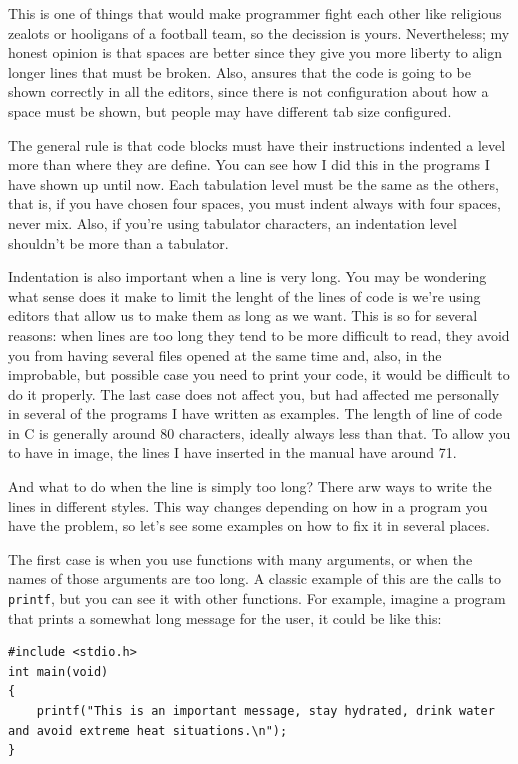 \documentclass[a4paper]{article}
\begin{document}
This is one of things that would make programmer fight each other like religious
zealots or hooligans of a football team, so the decission is yours.
Nevertheless; my honest opinion is that spaces are better since they give you
more liberty to align longer lines that must be broken. Also, ansures that the
code is going to be shown correctly in all the editors, since there is not
configuration about how a space must be shown, but people may have different tab
size configured.

The general rule is that code blocks must have their instructions indented a
level more than where they are define. You can see how I did this in the
programs I have shown up until now. Each tabulation level must be the same as
the others, that is, if you have chosen four spaces, you must indent always with
four spaces, never mix. Also, if you're using tabulator characters, an
indentation level shouldn't be more than a tabulator.

Indentation is also important when a line is very long. You may be wondering
what sense does it make to limit the lenght of the lines of code is we're using
editors that allow us to make them as long as we want. This is so for several
reasons: when lines are too long they tend to be more difficult to read, they
avoid you from having several files opened at the same time and, also, in the
improbable, but possible case you need to print your code, it would be difficult
to do it properly. The last case does not affect you, but had affected me
personally in several of the programs I have written as examples. The length of
line of code in C is generally around 80 characters, ideally always less than
that. To allow you to have in image, the lines I have inserted in the manual
have around 71.

And what to do when the line is simply too long? There arw ways to write the
lines in different styles. This way changes depending on how in a program you
have the problem, so let's see some examples on how to fix it in several places.

The first case is when you use functions with many arguments, or when the names
of those arguments are too long. A classic example of this are the calls to
\verb!printf!, but you can see it with other functions. For example, imagine
a program that prints a somewhat long message for the user, it could be like
this:

\noindent
\begin{minipage}[H]{\linewidth}
\mbox{}
\begin{lstlisting}[style=C,
caption={Long printing instruction},
label={lst:longprint}]
#include <stdio.h>
int main(void)
{
    printf("This is an important message, stay hydrated, drink water and avoid extreme heat situations.\n");
}

\end{lstlisting}
\end{minipage}
\end{document}
